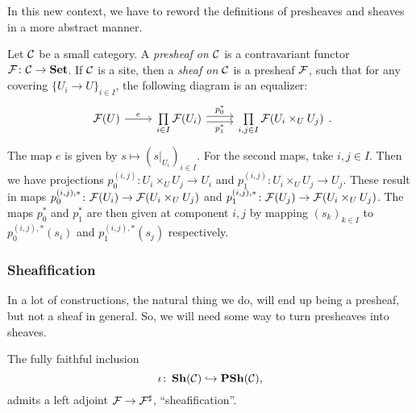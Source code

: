 \documentclass{article}
\begin{document}
In this new context, we have to reword the definitions
of presheaves and sheaves in a more abstract manner.
\begin{definition}
    Let $\mathcal{C}$ be a small category. A \emph{presheaf on $\mathcal{C}$} is
    a contravariant functor $\mathcal{F} \colon \mathcal{C} \to \operatorname{\mathbf{Set}}$.
    If $\mathcal{C}$ is a site, then a \emph{sheaf on $\mathcal{C}$} is a
    presheaf $\mathcal{F}$, such that for any covering $\{U_i \to U\}_{i\in I}$,
    the following diagram is an equalizer:
    \begin{equation*}
        \begin{tikzcd}
            \mcF(U) \rar["e"] &\prod\limits_{i\in I}\mcF(U_i)
            \rar[shift left, "p_0^*"] \rar[shift right, "p_1^*"']
            & \prod\limits_{i,j\in I}\mcF(U_i \times_U U_j)
        \end{tikzcd}.
    \end{equation*}
    The map $e$ is given by $s \mapsto (s|_{U_i})_{i\in I}$.
    For the second maps, take $i,j\in I$. Then we have projections
    $p^{(i,j)}_0 \colon U_i \times_U U_j \to U_i$ and
    $p^{(i,j)}_1 \colon U_i \times_U U_j \to U_j$.
    These result in maps
    $p^{(i,j), *}_0 \colon \mathcal{F}(U_i) \to \mathcal{F}(U_i \times_U U_j )$ and
    $p^{(i,j), *}_1 \colon \mathcal{F}(U_j) \to \mathcal{F}(U_i \times_U U_j )$.
    The maps $p_0^*$ and $p_1^*$ are
    then given at component $i,j$ by mapping $(s_k)_{k\in I}$ to
    $p^{(i,j), *}_0(s_i)$ and $p^{(i,j), *}_1(s_j)$ respectively.
\end{definition}

\subsubsection{Sheafification}
In a lot of constructions, the natural thing we do, will end up
being a presheaf, but not a sheaf in general. So, we will need some way to turn
presheaves into sheaves.
\begin{prop}
    \label{prop:sheafification}
    The fully faithful inclusion
    \begin{equation*}
        \iota \colon \operatorname{\mathbf{Sh}}(\mathcal{C}) \hookrightarrow \operatorname{\mathbf{PSh}}(\mathcal{C}),
    \end{equation*}
    admits a left adjoint $\mathcal{F} \to \mathcal{F}^\sharp$, ``sheafification''.
\end{prop}
\end{document}
